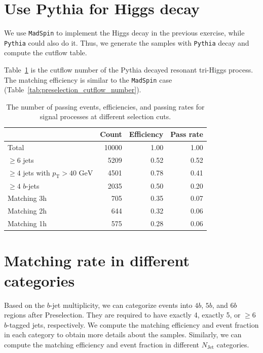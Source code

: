 \documentclass[12pt]{article}
\begin{document}
\section{Use Pythia for Higgs decay}%
\label{sec:use_pythia_for_higgs_decay}
	We use \verb|MadSpin| to implement the Higgs decay in the previous exercise, while \verb|Pythia| could also do it. Thus, we generate the samples with \verb|Pythia| decay and compute the cutflow table.

    Table~\ref{tab:preselection_cutflow_number_pythia_decay} is the cutflow number of the Pythia decayed resonant tri-Higgs process. The matching efficiency is similar to the \verb|MadSpin| case (Table~\ref{tab:preselection_cutflow_number}).
	\begin{table}[htpb]
        \centering
        \caption{The number of passing events, efficiencies, and passing rates for signal processes at different selection cuts.}
        \label{tab:preselection_cutflow_number_pythia_decay}
        \begin{tabular}{l|rrr}
                                                         & Count  & Efficiency & Pass rate \\ \hline
        Total                                            & 10000 & 1.00       & 1.00      \\
        $\ge 6$ jets                                     & 5209  & 0.52       & 0.52      \\
        $\ge 4$ jets with $p_{\text{T}} > \text{40 GeV}$ & 4501  & 0.78       & 0.41      \\
        $\ge 4$ $b$-jets                                 & 2035  & 0.50       & 0.20      \\ \hline
        Matching 3h                                      & 705   & 0.35       & 0.07      \\
        Matching 2h                                      & 644   & 0.32       & 0.06      \\
        Matching 1h                                      & 575   & 0.28       & 0.06      \\
        \end{tabular}
    \end{table}
\section{Matching rate in different categories}%
\label{sec:matching_rate_in_different_categories}
    Based on the $b$-jet multiplicity, we can categorize events into $4b$,  $5b$, and $6b$ regions after Preselection. They are required to have exactly 4, exactly 5, or $\ge 6$ $b$-tagged jets, respectively. We compute the matching efficiency and event fraction in each category to obtain more details about the samples. Similarly, we can compute the matching efficiency and event fraction in different $N_{\text{Jet}}$ categories.
\end{document}
